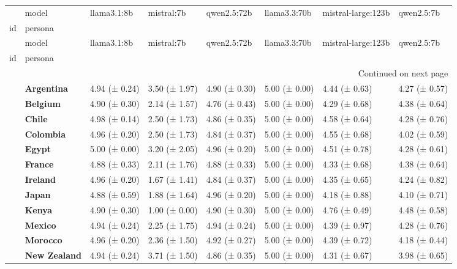 \begin{longtable}{llllllll}
\toprule
 & model & llama3.1:8b & mistral:7b & qwen2.5:72b & llama3.3:70b & mistral-large:123b & qwen2.5:7b \\
id & persona &  &  &  &  &  &  \\
\midrule
\endfirsthead
\toprule
 & model & llama3.1:8b & mistral:7b & qwen2.5:72b & llama3.3:70b & mistral-large:123b & qwen2.5:7b \\
id & persona &  &  &  &  &  &  \\
\midrule
\endhead
\midrule
\multicolumn{8}{r}{Continued on next page} \\
\midrule
\endfoot
\bottomrule
\endlastfoot
\multirow[t]{19}{*}{\textbf{1}} & \textbf{Argentina} & 4.94 (± 0.24) & 3.50 (± 1.97) & 4.90 (± 0.30) & 5.00 (± 0.00) & 4.44 (± 0.63) & 4.27 (± 0.57) \\
\textbf{} & \textbf{Belgium} & 4.90 (± 0.30) & 2.14 (± 1.57) & 4.76 (± 0.43) & 5.00 (± 0.00) & 4.29 (± 0.68) & 4.38 (± 0.64) \\
\textbf{} & \textbf{Chile} & 4.98 (± 0.14) & 2.50 (± 1.73) & 4.86 (± 0.35) & 5.00 (± 0.00) & 4.58 (± 0.64) & 4.28 (± 0.76) \\
\textbf{} & \textbf{Colombia} & 4.96 (± 0.20) & 2.50 (± 1.73) & 4.84 (± 0.37) & 5.00 (± 0.00) & 4.55 (± 0.68) & 4.02 (± 0.59) \\
\textbf{} & \textbf{Egypt} & 5.00 (± 0.00) & 3.20 (± 2.05) & 4.96 (± 0.20) & 5.00 (± 0.00) & 4.51 (± 0.78) & 4.28 (± 0.61) \\
\textbf{} & \textbf{France} & 4.88 (± 0.33) & 2.11 (± 1.76) & 4.88 (± 0.33) & 5.00 (± 0.00) & 4.33 (± 0.68) & 4.38 (± 0.64) \\
\textbf{} & \textbf{Ireland} & 4.96 (± 0.20) & 1.67 (± 1.41) & 4.84 (± 0.37) & 5.00 (± 0.00) & 4.35 (± 0.65) & 4.24 (± 0.82) \\
\textbf{} & \textbf{Japan} & 4.88 (± 0.59) & 1.88 (± 1.64) & 4.96 (± 0.20) & 5.00 (± 0.00) & 4.18 (± 0.88) & 4.10 (± 0.71) \\
\textbf{} & \textbf{Kenya} & 4.90 (± 0.30) & 1.00 (± 0.00) & 4.90 (± 0.30) & 5.00 (± 0.00) & 4.76 (± 0.49) & 4.48 (± 0.58) \\
\textbf{} & \textbf{Mexico} & 4.94 (± 0.24) & 2.25 (± 1.75) & 4.94 (± 0.24) & 5.00 (± 0.00) & 4.39 (± 0.97) & 4.28 (± 0.76) \\
\textbf{} & \textbf{Morocco} & 4.96 (± 0.20) & 2.36 (± 1.50) & 4.92 (± 0.27) & 5.00 (± 0.00) & 4.39 (± 0.72) & 4.18 (± 0.44) \\
\textbf{} & \textbf{New Zealand} & 4.94 (± 0.24) & 3.71 (± 1.50) & 4.86 (± 0.35) & 5.00 (± 0.00) & 4.31 (± 0.67) & 3.98 (± 0.65) \\

\end{longtable}
